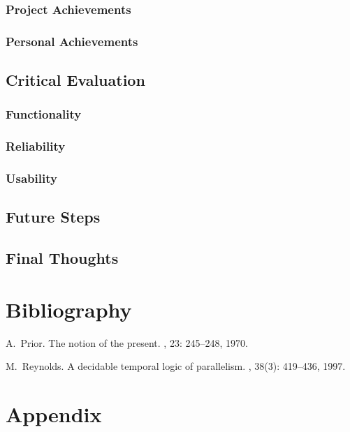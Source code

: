 \documentclass{report}
\begin{document}
\subsection{Project Achievements}
\subsection{Personal Achievements}

\section{Critical Evaluation}
\subsection{Functionality}
\subsection{Reliability}
\subsection{Usability}

\section{Future Steps}
\section{Final Thoughts}

\appendix

\chapter{Bibliography}

\begin{thebibliography}{HHM99}


A.~Prior.
\newblock The notion of the present.
, 23:  245--248, 1970.


M.~Reynolds.
\newblock A decidable temporal logic of parallelism.
, 38(3):  419--436,
  1997.
\end{thebibliography}

\chapter{Appendix}
\end{document}
